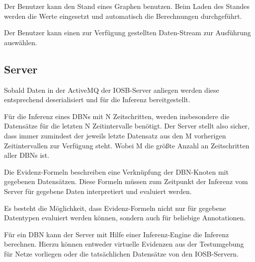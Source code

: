 \documentclass[parskip=full,11pt,twoside]{scrartcl}
\begin{document}


Der Benutzer kann den Stand eines Graphen benutzen. Beim Laden des Standes werden die Werte eingesetzt und automatisch die Berechnungen durchgeführt.


Der Benutzer kann einen zur Verfügung gestellten Daten-Stream zur Ausführung auswählen.

\subsection{Server}


Sobald Daten in der \gls{ActiveMQ} der IOSB-Server anliegen werden diese entsprechend deserialisiert und für die Inferenz bereitgestellt.

Für die Inferenz eines DBNs mit N Zeitschritten, werden insbesondere die Datensätze für die letzten N Zeitintervalle benötigt. Der Server stellt also sicher, dass immer zumindest der jeweils letzte Datensatz aus den M vorherigen Zeitintervallen zur Verfügung steht. Wobei M die größte Anzahl an Zeitschritten aller DBNs ist.

Die Evidenz-Formeln beschreiben eine Verknüpfung der DBN-Knoten mit gegebenen Datensätzen. Diese Formeln müssen zum Zeitpunkt der Inferenz vom Server für gegebene Daten interpretiert und evaluiert werden.

\pagebreak
{}
Es besteht die Möglichkeit, dass Evidenz-Formeln nicht nur für gegebene Datentypen evaluiert werden können, sondern auch für beliebige Annotationen.

Für ein DBN kann der Server mit Hilfe einer Inferenz-Engine die Inferenz berechnen. Hierzu können entweder virtuelle Evidenzen aus der Testumgebung für Netze vorliegen oder die tatsächlichen Datensätze von den IOSB-Servern.
\end{document}
